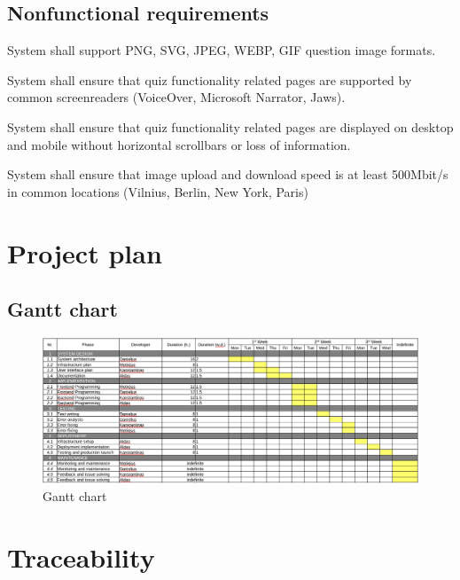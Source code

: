 \documentclass[
    english, %
]{VUMIFPSkursinis}
\begin{document}
\subsection{Nonfunctional requirements}


\begin{nfrlist}
    \item System shall support PNG, SVG, JPEG, WEBP, GIF question image formats.
    \item System shall ensure that quiz functionality related pages are supported by common screenreaders (VoiceOver, Microsoft Narrator, Jaws).
    \item System shall ensure that quiz functionality related pages are displayed on desktop and mobile without horizontal scrollbars or loss of information.
    \item System shall ensure that image upload and download speed is at least 500Mbit/s in common locations (Vilnius, Berlin, New York, Paris)
\end{nfrlist}

\section{Project plan}

\subsection{Gantt chart}

\begin{figure}[ht]
    \centering
    \includegraphics[width=\textwidth]{../lab3diags/Gantt_image.png}
    \caption{Gantt chart}
    \label{gantt-table}
\end{figure}

\section{Traceability}
\end{document}
